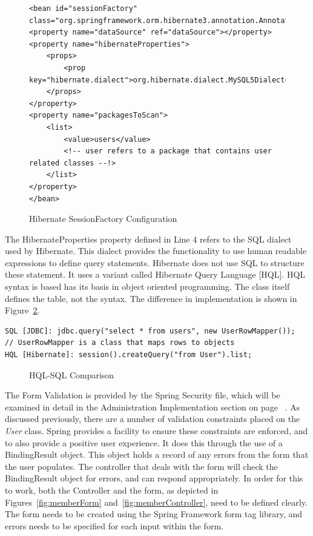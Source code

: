 \begin{figure}[H]
\begin{lstlisting}
<bean id="sessionFactory"
class="org.springframework.orm.hibernate3.annotation.AnnotationSessionFactoryBean">
<property name="dataSource" ref="dataSource"></property>
<property name="hibernateProperties">
	<props>
		<prop key="hibernate.dialect">org.hibernate.dialect.MySQL5Dialect</prop>
	</props>
</property>
<property name="packagesToScan">
	<list>
		<value>users</value> 
		<!-- user refers to a package that contains user related classes --!>
	</list>
</property>
</bean>
\end{lstlisting}
\caption{Hibernate SessionFactory Configuration}
\label{fig:hibernateConfig}
\end{figure}

The HibernateProperties property defined in Line 4 refers to the SQL dialect used by Hibernate. This dialect provides the functionality to use human readable expressions to define query statements. Hibernate does not use SQL to structure these statement. It uses a variant called Hibernate Query Language [HQL]. HQL syntax is based has its basis in object oriented programming. The class itself defines the table, not the syntax. The difference in implementation is shown in Figure~\ref{fig:hqlsql}.

\begin{lstlisting}
SQL [JDBC]: jdbc.query("select * from users", new UserRowMapper());
// UserRowMapper is a class that maps rows to objects
HQL [Hibernate]: session().createQuery("from User").list;
\end{lstlisting}
\begin{figure}[H]
\caption{HQL-SQL Comparison}
\label{fig:hqlsql}
\end{figure}
 
The Form Validation is provided by the Spring Security file, which will be examined in detail in the Administration Implementation section on page ~\pageref{sec:adminImp}. As discussed previously, there are a number of validation constraints placed on the \textit{User} class. Spring provides a facility to ensure these constraints are enforced, and to also provide a positive user experience. It does this through the use of a BindingResult object. This object holds a record of any errors from the form that the user populates. The controller that deals with the form will check the BindingResult object for errors, and can respond appropriately. In order for this to work, both the Controller and the form, as depicted in Figures~\ref{fig:memberForm} and~\ref{fig:memberController}, need to be defined clearly. The form needs to be created  using the Spring Framework form tag library, and errors needs to be specified for each input within the form. 

